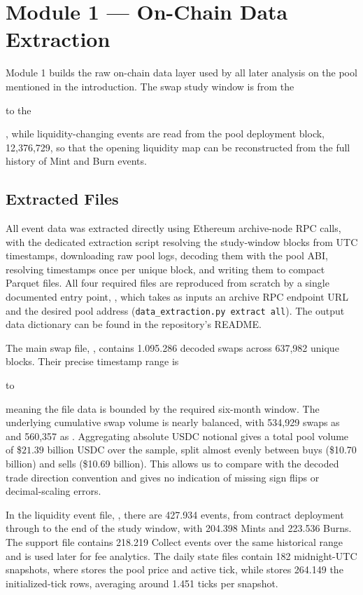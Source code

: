 \section{Module 1 --- On-Chain Data Extraction}
\label{sec:module1}

Module 1 builds the raw on-chain data layer used by all later analysis on the pool mentioned in the introduction.  The swap study window is from 
the \date{1st of October 2025} to the \date{31st of March 2026}, while liquidity-changing events are read from
the pool deployment block, 12,376,729, so that the opening liquidity map can
be reconstructed from the full history of Mint and Burn events.

\subsection{Extracted Files}
\label{subsec:m1-files}

All event data was extracted directly using Ethereum archive-node RPC calls, with 
the dedicated extraction script resolving the study-window blocks from UTC timestamps,
downloading raw pool logs, decoding them with the pool ABI, resolving timestamps once
per unique block, and writing them to compact Parquet files.  All four required files are
reproduced from scratch by a single documented entry point,
, which takes as inputs an archive RPC
endpoint URL and the desired pool address (\texttt{data\_extraction.py extract all}). 
The output data dictionary can be found in the repository's README.

The main swap file, , contains \num{1,095,286} decoded swaps
across 637,982 unique blocks. Their precise timestamp range is
\date{2025-10-01 00:00:11 UTC} to \date{2026-03-31 23:59:59 UTC} meaning the file data is bounded by
the required six-month window. The underlying cumulative swap volume is nearly balanced, with 534,929 swaps as
 and 560,357 as . Aggregating absolute USDC
notional gives a total pool volume of \$$21.39$ billion USDC over the sample, split
almost evenly between buys (\$10.70 billion) and sells (\$10.69 billion). 
This allows us to compare with the decoded trade direction convention and 
gives no indication of missing sign flips or decimal-scaling errors.

In the liquidity event file, , there are \num{427,934}
events, from contract deployment through to the end of the study window, with \num{204,398} Mints and
\num{223,536} Burns. The support file  contains \num{218,219}
Collect events over the same historical range and is used later for fee
analytics.  The daily state files contain \num{182} midnight-UTC snapshots, where
 stores the pool price and active tick, while
 stores \num{264,149} the initialized-tick rows,
averaging around \num{1,451} ticks per snapshot.

